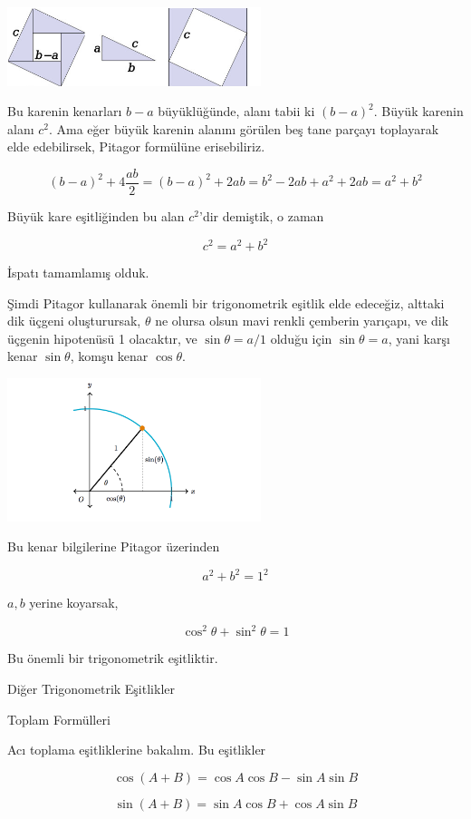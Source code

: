 \documentclass[12pt,fleqn]{article}\usepackage{../../common}
\begin{document}
\includegraphics[width=20em]{Pythagoras.png}

Bu karenin kenarları $b-a$ büyüklüğünde, alanı tabii ki $(b-a)^2$. Büyük karenin
alanı $c^2$. Ama eğer büyük karenin alanını görülen beş tane parçayı toplayarak
elde edebilirsek, Pitagor formülüne erisebiliriz.

$$
(b-a)^2 + 4 \frac{ab}{2} = (b-a)^2 + 2 ab = b^2 -2ab + a^2 + 2ab = a^2 + b^2
$$

Büyük kare eşitliğinden bu alan $c^2$'dir demiştik, o zaman

$$
c^2 = a^2 + b^2
$$

İspatı tamamlamış olduk.

Şimdi Pitagor kullanarak önemli bir trigonometrik eşitlik elde edeceğiz, alttaki
dik üçgeni oluşturursak, $\theta$ ne olursa olsun mavi renkli çemberin yarıçapı,
ve dik üçgenin hipotenüsü 1 olacaktır, ve $\sin\theta = a / 1$ olduğu için
$\sin\theta = a$, yani karşı kenar $\sin\theta$, komşu kenar $\cos\theta$.

\includegraphics[width=20em]{PythagorSinCos.png}

Bu kenar bilgilerine Pitagor üzerinden

$$
a^2 + b^2 = 1^2 
$$

$a,b$ yerine koyarsak,

$$
\cos^2\theta + \sin^2\theta = 1
$$

Bu önemli bir trigonometrik eşitliktir.

Diğer Trigonometrik Eşitlikler

Toplam Formülleri

Acı toplama eşitliklerine bakalım. Bu eşitlikler

$$
\cos(A+B) = \cos A \cos B - \sin A \sin B
$$

$$
\sin(A+B) = \sin A \cos B + \cos A \sin B
$$
\end{document}
